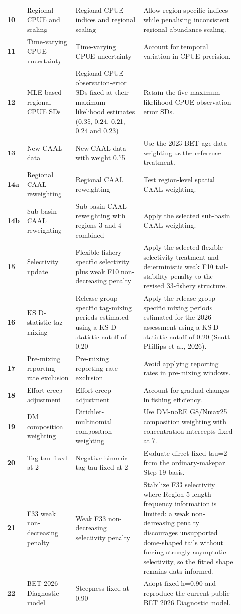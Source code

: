\begin{longtable}{@{}>{\centering\arraybackslash}p{0.05\linewidth}>{\raggedright\arraybackslash}p{0.20\linewidth}>{\raggedright\arraybackslash}p{0.29\linewidth}>{\raggedright\arraybackslash}p{0.40\linewidth}@{}}
\textbf{10} & Regional CPUE and scaling & Regional CPUE indices and regional scaling & Allow region-specific indices while penalising inconsistent regional abundance scaling. \\
\textbf{11} & Time-varying CPUE uncertainty & Time-varying CPUE uncertainty & Account for temporal variation in CPUE precision. \\
\textbf{12} & MLE-based regional CPUE SDs & Regional CPUE observation-error SDs fixed at their maximum-likelihood estimates (0.35, 0.24, 0.21, 0.24 and 0.23) & Retain the five maximum-likelihood CPUE observation-error SDs. \\
\textbf{13} & New CAAL data & New CAAL data with weight 0.75 & Use the 2023 BET age-data weighting as the reference treatment. \\
\textbf{14a} & Regional CAAL reweighting & Regional CAAL reweighting & Test region-level spatial CAAL weighting. \\
\textbf{14b} & Sub-basin CAAL reweighting & Sub-basin CAAL reweighting with regions 3 and 4 combined & Apply the selected sub-basin CAAL weighting. \\
\textbf{15} & Selectivity update & Flexible fishery-specific selectivity plus weak F10 non-decreasing penalty & Apply the selected flexible-selectivity treatment and deterministic weak F10 tail-stability penalty to the revised 33-fishery structure. \\
\textbf{16} & KS D-statistic tag mixing & Release-group-specific tag-mixing periods estimated using a KS D-statistic cutoff of 0.20 & Apply the release-group-specific mixing periods estimated for the 2026 assessment using a KS D-statistic cutoff of 0.20 (Scutt Phillips et al., 2026). \\
\textbf{17} & Pre-mixing reporting-rate exclusion & Pre-mixing reporting-rate exclusion & Avoid applying reporting rates in pre-mixing windows. \\
\textbf{18} & Effort-creep adjustment & Effort-creep adjustment & Account for gradual changes in fishing efficiency. \\
\textbf{19} & DM composition weighting & Dirichlet-multinomial composition weighting & Use DM-noRE G8/Nmax25 composition weighting with concentration intercepts fixed at 7. \\
\textbf{20} & Tag tau fixed at 2 & Negative-binomial tag tau fixed at 2 & Evaluate direct fixed tau=2 from the ordinary-makepar Step 19 basis. \\
\textbf{21} & F33 weak non-decreasing penalty & Weak F33 non-decreasing selectivity penalty & Stabilize F33 selectivity where Region 5 length-frequency information is limited: a weak non-decreasing penalty discourages unsupported dome-shaped tails without forcing strongly asymptotic selectivity, so the fitted shape remains data informed. \\
\textbf{22} & BET 2026 Diagnostic model & Steepness fixed at 0.90 & Adopt fixed h=0.90 and reproduce the current public BET 2026 Diagnostic model. \\
\bottomrule
\end{longtable}
